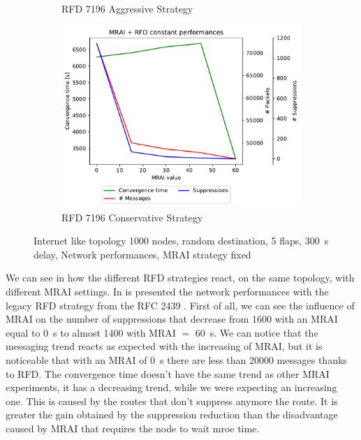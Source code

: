 \begin{figure}[h]
\begin{subfigure}[b]{0.325\textwidth}
         \caption{RFD 7196 Aggressive Strategy}
         \label{fig:1000_7196RFDA_multiMRAI_mice}
     \end{subfigure}
     \hfill
     \begin{subfigure}[b]{0.325\textwidth}
         \centering
         \includegraphics[width=\textwidth]{images/RFD/miceVSelephants/MultiMRAI/mice/cisco_1000_RFD_7196_conservative-constant_mrai_rfd_evolution.pdf}
         \caption{RFD 7196 Conservative Strategy}
         \label{fig:1000_7196RFDC_multiMRAI_mice}
     \end{subfigure}
		\caption{Internet like topology \num{1000} nodes, random destination, 
		\num{5} flaps, \SI{300}{\second} delay, Network performances, \ac{MRAI}
		strategy fixed}
        \label{fig:1000_RFD_multiMRAI_mice}
\end{figure}


We can see in  how the different \ac{RFD} strategies
react, on the same topology, with different \ac{MRAI} settings.
In  is presented the network performances
with the legacy \ac{RFD} strategy from the \ac{RFC} \num{2439} \cite{rfc2439}.
First of all, we can see the influence of \ac{MRAI} on the number of suppressions
that decrease from \num{1600} with an \ac{MRAI} equal to \SI{0}{\second} to almost
\num{1400} with \ac{MRAI} $=$ \SI{60}{\second}.
We can notice that the messaging trend reacts as expected with the increasing of
\ac{MRAI}, but it is noticeable that with an \ac{MRAI} of \SI{0}{\second} there
are less than \num{20000} messages thanks to \ac{RFD}.
The convergence time doesn't have the same trend as other \ac{MRAI} experiments,
it has a decreasing trend, while we were expecting an increasing one.
This is caused by the routes that don't suppress anymore the route.
It is greater the gain obtained by the suppression reduction than the disadvantage
caused by \ac{MRAI} that requires the node to wait mroe time.

